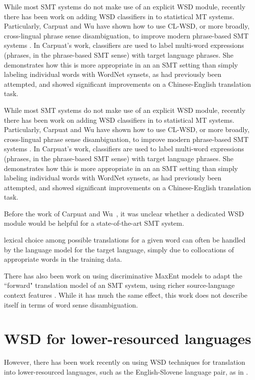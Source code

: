 While most SMT systems do not make use of an explicit WSD module, recently
there has been work on adding WSD classifiers in to statistical MT systems.
Particularly, Carpuat and Wu have shown how to use CL-WSD, or more broadly,
cross-lingual phrase sense disambiguation, to improve modern phrase-based SMT
systems
\cite{carpuatpsd,carpuat-wu:2007:EMNLP-CoNLL2007,carpuat2008evaluation}. In
Carpuat's work, classifiers are used to label multi-word expressions (phrases,
in the phrase-based SMT sense) with target language phrases. She demonstrates
how this is more appropriate in an an SMT setting than simply labeling
individual words with WordNet synsets, as had previously been attempted, and
showed significant improvements on a Chinese-English translation task.

While most SMT systems do not make use of an explicit WSD module, recently
there has been work on adding WSD classifiers in to statistical MT systems.
Particularly, Carpuat and Wu have shown how to use CL-WSD, or more broadly,
cross-lingual phrase sense disambiguation, to improve modern phrase-based SMT
systems
\cite{carpuatpsd,carpuat-wu:2007:EMNLP-CoNLL2007,carpuat2008evaluation}. In
Carpuat's work, classifiers are used to label multi-word expressions (phrases,
in the phrase-based SMT sense) with target language phrases. She demonstrates
how this is more appropriate in an an SMT setting than simply labeling
individual words with WordNet synsets, as had previously been attempted, and
showed significant improvements on a Chinese-English translation task.

Before the work of Carpuat and Wu~\cite{improvingsmtwsd}, it was
unclear whether a dedicated WSD module would be helpful for a state-of-the-art 
SMT system.

lexical choice among possible translations for a given word can
often be handled by the language model for the target language, simply due to
collocations of appropriate words in the training data.


There has also been work on using discriminative MaxEnt models to adapt
the ``forward" translation model of an SMT system, using richer
source-language context features \cite{vzabokrtsky-popel-marevcek:2010:WMT}.
While it has much the same effect, this work does not describe itself in terms
of word sense disambiguation.




\section{WSD for lower-resourced languages}
However, there has been work recently on using WSD techniques for translation
into lower-resourced languages, such as the English-Slovene language pair, as
in \cite{vintar-fivser-vrvsvcaj:2012:ESIRMT-HyTra2012}. 

